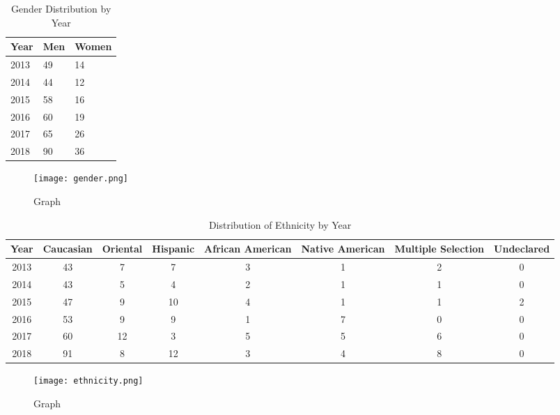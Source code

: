 \documentclass{article}
\begin{document}
\begin{table}[H]
\centering
\caption{Gender Distribution by Year}
\label{Gender}
\begin{tabular}{l|l|l}
Year & Men & Women \\ \hline
2013 & 49  & 14    \\ \hline
2014 & 44  & 12    \\ \hline
2015 & 58  & 16    \\ \hline
2016 & 60  & 19    \\ \hline
2017 & 65  & 26    \\ \hline
2018 & 90  & 36   
\end{tabular}
\end{table}

\begin{figure}[H]
\centering
\texttt{[image: gender.png]}
\caption{Graph}
\label{fig:Gender}
\end{figure}

\begin{table}[H]
\centering
\caption{Distribution of Ethnicity by Year}
\label{Ethnicity}
\begin{tabular}{c|c|c|c|c|c|c|c}
Year & Caucasian & Oriental & Hispanic & African American & Native American & Multiple Selection & Undeclared \\ \hline
2013 & 43        & 7		& 7        & 3                & 1               & 2                  & 0          \\ \hline
2014 & 43        & 5		& 4        & 2                & 1               & 1                  & 0          \\ \hline
2015 & 47        & 9        & 10       & 4                & 1               & 1                  & 2          \\ \hline
2016 & 53        & 9		& 9        & 1                & 7               & 0                  & 0          \\ \hline
2017 & 60        & 12		& 3        & 5                & 5               & 6                  & 0          \\ \hline
2018 & 91        & 8        & 12       & 3                & 4               & 8                  & 0         
\end{tabular}
\end{table}

\begin{figure}[H]
\centering
\texttt{[image: ethnicity.png]}
\caption{Graph}
\label{fig:Ethnicity}
\end{figure}
\end{document}
